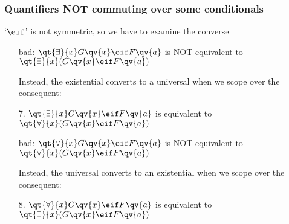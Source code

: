 \begin{frame}
\frametitle{Quantifiers NOT commuting over some conditionals}

`$\eif$' is not symmetric, so we have to examine the converse %

\begin{enumerate}[<+->]

\item[bad:] $\qt{\exists}{x}G\qv{x} \eif F\qv{a}$ is NOT equivalent to $\qt{\exists}{x}(G\qv{x} \eif F\qv{a})$

\item[] Instead, the existential converts to a universal when we scope over the consequent:

\item[7.] $\qt{\exists}{x}G\qv{x} \eif F\qv{a}$ is equivalent to  $\qt{\forall}{x}(G\qv{x} \eif F\qv{a})$

\item[bad:] $\qt{\forall}{x}G\qv{x} \eif F\qv{a}$ is NOT equivalent to $\qt{\forall}{x}(G\qv{x} \eif F\qv{a})$

\item[] Instead, the universal converts to an existential when we scope over the consequent:

\item[8.] $\qt{\forall}{x}G\qv{x} \eif F\qv{a}$ is equivalent to  $\qt{\exists}{x}(G\qv{x} \eif F\qv{a})$


\end{enumerate}

\end{frame}


